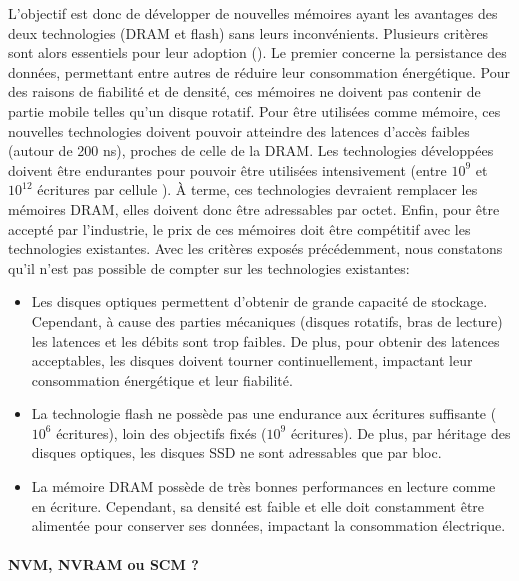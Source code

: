         L'objectif est donc de développer de nouvelles mémoires ayant les avantages des deux technologies (DRAM et flash) sans leurs inconvénients. Plusieurs critères sont alors essentiels pour leur adoption (\cite{Freitas2008}). Le premier  concerne la persistance des données, permettant entre autres de réduire leur consommation énergétique. Pour des raisons de fiabilité et de densité, ces mémoires ne doivent pas contenir de partie mobile telles qu'un disque rotatif. Pour être utilisées comme mémoire, ces nouvelles technologies doivent pouvoir atteindre des latences d'accès faibles (autour de 200 ns\cite{IBM2013}), proches de celle de la DRAM. Les technologies développées doivent être endurantes pour pouvoir être utilisées intensivement (entre $10^9$ et $10^{12}$ écritures par cellule \cite{IBM2013}). À terme, ces technologies devraient remplacer les mémoires DRAM, elles doivent donc être adressables par octet. Enfin, pour être accepté par l'industrie, le prix de ces mémoires doit être compétitif avec les technologies existantes. Avec les critères exposés précédemment, nous constatons qu'il n'est pas possible de compter sur les technologies existantes:
        \begin{itemize}
            \item Les disques optiques permettent d'obtenir de grande capacité de stockage. Cependant, à cause des parties mécaniques (disques rotatifs, bras de lecture) les latences et les débits sont trop faibles. De plus, pour obtenir des latences acceptables, les disques doivent tourner continuellement, impactant leur consommation énergétique et leur fiabilité.
            \item La technologie flash ne possède pas une endurance aux écritures suffisante ($10^6$ écritures), loin des objectifs fixés ($10^9$ écritures). De plus, par héritage des disques optiques, les disques SSD ne sont adressables que par bloc.
            \item La mémoire DRAM possède de très bonnes performances en lecture comme en écriture. Cependant, sa densité est faible et elle doit constamment être alimentée pour conserver ses données, impactant la consommation électrique.
        \end{itemize}
  
        
    
        
        \paragraph{NVM, NVRAM ou SCM ?}
            
